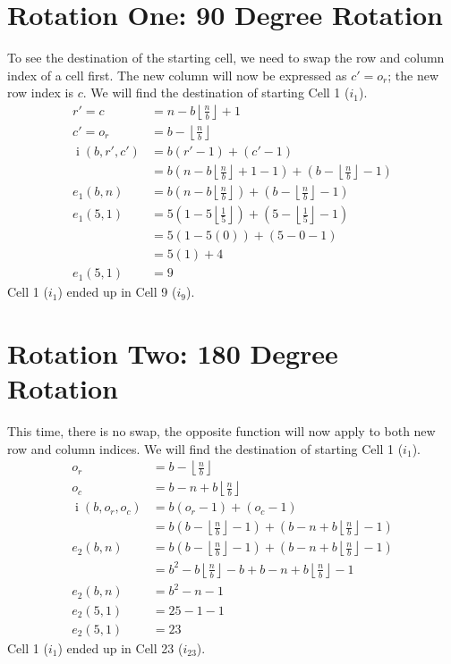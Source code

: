 \documentclass[twoside,openany,12pt]{book}
\begin{document}
    \section{Rotation One: 90 Degree Rotation}
    To see the destination of the starting cell, we need to swap the row and column index of a cell first. The new column will now be expressed as $c' = o_r$; the new row index is $c$. We will find the destination of starting Cell 1 ($i_1$). 
    \begin{equation}
      \begin{split} 
        r' = c &= n - b\left\lfloor \frac{n}{b} \right\rfloor + 1 \\
        c' = o_r &= b - \left\lfloor \frac{n}{b} \right\rfloor \\
        \operatorname{i}(b,r',c') &= b(r'-1) + (c'-1) \\ 
            &= b(n - b\left\lfloor \frac{n}{b} \right\rfloor + 1 -1) + (b - \left\lfloor \frac{n}{b} \right\rfloor-1) \\
        e_1(b,n) &= b(n - b\left\lfloor \frac{n}{b} \right\rfloor) + (b - \left\lfloor \frac{n}{b} \right\rfloor - 1) \\
        e_1(5,1) &= 5(1 - 5\left\lfloor \frac{1}{5} \right\rfloor) + (5 - \left\lfloor \frac{1}{5} \right\rfloor - 1) \\
                 &= 5(1 - 5(0)) + (5 - 0 - 1) \\
                 &= 5(1) + 4 \\
        e_1(5,1) &= 9
      \end{split}
    \end{equation}
    Cell 1 ($i_1$) ended up in Cell 9 ($i_9$).

    \section{Rotation Two: 180 Degree Rotation}
    This time, there is no swap, the opposite function will now apply to both new row and column indices. We will find the destination of starting Cell 1 ($i_1$). 
    \begin{align*}
        o_r &= b - \left\lfloor \frac{n}{b} \right\rfloor \\
        o_c &= b - n + b\left\lfloor \frac{n}{b} \right\rfloor \\
        \operatorname{i}(b,o_r,o_c) &= b(o_r-1) + (o_c-1) \\ 
            &= b(b - \left\lfloor \frac{n}{b} \right\rfloor-1) + (b - n + b\left\lfloor \frac{n}{b} \right\rfloor -1) \\
        e_2(b,n) &= b(b - \left\lfloor \frac{n}{b} \right\rfloor-1) + (b - n + b\left\lfloor \frac{n}{b} \right\rfloor -1) \\
                 &= b^2 - b\left\lfloor \frac{n}{b} \right\rfloor - b + b - n + b\left\lfloor \frac{n}{b} \right\rfloor -1 \\
        e_2(b,n) &= b^2 - n - 1 \\
        e_2(5,1) &= 25 - 1 - 1 \\
        e_2(5,1) &= 23
    \end{align*}
    Cell 1 ($i_1$) ended up in Cell 23 ($i_{23}$).
\end{document}
